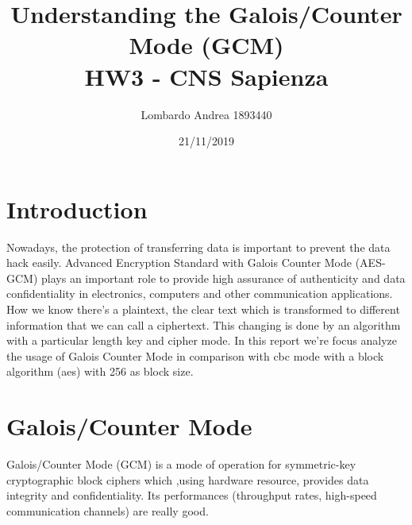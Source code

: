 \documentclass[11pt,a4paper]{article}
\title{Understanding the Galois/Counter Mode (GCM)\\ HW3 - CNS Sapienza}
\author{Lombardo Andrea 1893440 }
\date{21/11/2019}
\begin{document}
\maketitle
\newpage
\section{Introduction}
 Nowadays, the protection of transferring data is important to prevent the data hack
easily. Advanced Encryption Standard with Galois Counter Mode (AES-GCM) plays an
important role to provide high assurance of authenticity and data confidentiality in electronics,
computers and other communication applications. 
How we know there's a plaintext, the clear text which is transformed to different information that we can call a ciphertext. This changing is done by an algorithm with a particular length key and cipher mode.
In this report we're focus analyze the usage of Galois Counter Mode in comparison with cbc mode with a block algorithm (aes) with 256 as block size. 

\section{Galois/Counter Mode}
Galois/Counter Mode (GCM) is a mode of operation for symmetric-key cryptographic block ciphers which ,using hardware resource, provides data integrity and confidentiality. Its performances (throughput rates, high-speed communication channels) are really good.
\end{document}
